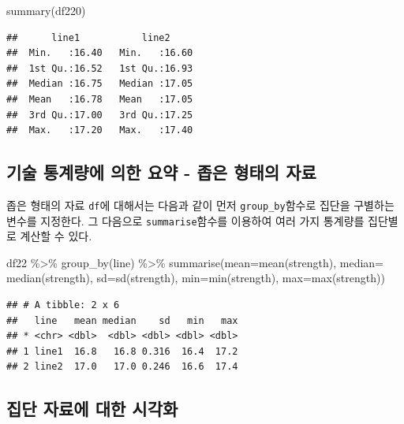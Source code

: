\documentclass[
]{book}
\newenvironment{Shaded}{\begin{snugshade}}{\end{snugshade}}
\newcommand{\AttributeTok}[1]{\textcolor[rgb]{0.77,0.63,0.00}{#1}}
\newcommand{\FunctionTok}[1]{\textcolor[rgb]{0.00,0.00,0.00}{#1}}
\newcommand{\NormalTok}[1]{#1}
\newcommand{\SpecialCharTok}[1]{\textcolor[rgb]{0.00,0.00,0.00}{#1}}
\begin{document}
\begin{Shaded}
\begin{Highlighting}[]
\FunctionTok{summary}\NormalTok{(df220)}
\end{Highlighting}
\end{Shaded}

\begin{verbatim}
##      line1           line2      
##  Min.   :16.40   Min.   :16.60  
##  1st Qu.:16.52   1st Qu.:16.93  
##  Median :16.75   Median :17.05  
##  Mean   :16.78   Mean   :17.05  
##  3rd Qu.:17.00   3rd Qu.:17.25  
##  Max.   :17.20   Max.   :17.40
\end{verbatim}

\hypertarget{uxae30uxc220-uxd1b5uxacc4uxb7c9uxc5d0-uxc758uxd55c-uxc694uxc57d---uxc881uxc740-uxd615uxd0dcuxc758-uxc790uxb8cc}{%
\subsection{기술 통계량에 의한 요약 - 좁은 형태의 자료}\label{uxae30uxc220-uxd1b5uxacc4uxb7c9uxc5d0-uxc758uxd55c-uxc694uxc57d---uxc881uxc740-uxd615uxd0dcuxc758-uxc790uxb8cc}}

좁은 형태의 자료 \texttt{df}에 대해서는 다음과 같이 먼저 \texttt{group\_by}함수로 집단을 구별하는 변수를 지정한다. 그 다음으로 \texttt{summarise}함수를 이용하여 여러 가지 통계량를 집단별로 계산할 수 있다.

\begin{Shaded}
\begin{Highlighting}[]
\NormalTok{df22 }\SpecialCharTok{\%\textgreater{}\%} \FunctionTok{group\_by}\NormalTok{(line)  }\SpecialCharTok{\%\textgreater{}\%}  \FunctionTok{summarise}\NormalTok{(}\AttributeTok{mean=}\FunctionTok{mean}\NormalTok{(strength), }\AttributeTok{median=} \FunctionTok{median}\NormalTok{(strength), }\AttributeTok{sd=}\FunctionTok{sd}\NormalTok{(strength), }\AttributeTok{min=}\FunctionTok{min}\NormalTok{(strength), }\AttributeTok{max=}\FunctionTok{max}\NormalTok{(strength))}
\end{Highlighting}
\end{Shaded}

\begin{verbatim}
## # A tibble: 2 x 6
##   line   mean median    sd   min   max
## * <chr> <dbl>  <dbl> <dbl> <dbl> <dbl>
## 1 line1  16.8   16.8 0.316  16.4  17.2
## 2 line2  17.0   17.0 0.246  16.6  17.4
\end{verbatim}

\hypertarget{uxc9d1uxb2e8-uxc790uxb8ccuxc5d0-uxb300uxd55c-uxc2dcuxac01uxd654}{%
\subsection{집단 자료에 대한 시각화}\label{uxc9d1uxb2e8-uxc790uxb8ccuxc5d0-uxb300uxd55c-uxc2dcuxac01uxd654}}
\end{document}
